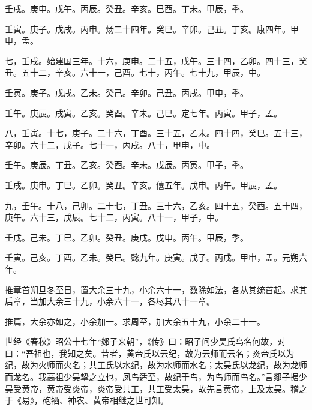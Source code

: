 \documentclass[12pt,UTF8]{ctexbook}
\begin{document}
壬戌。庚申。戊午。丙辰。癸丑。辛亥。巳酉。丁未。甲辰，季。



壬寅。庚子。戊戌。丙申。炀二十四年。癸巳。辛卯。己丑。丁亥。康四年。甲申，孟。



七，壬戌。始建国三年。十六，庚申。二十五，戊午。三十四，乙卯。四十三，癸丑。五十二，辛亥。六十一，己酉。七十，丙午。七十九，甲辰，中。



壬寅。庚子。戊戌。乙未。癸己。辛卯。己丑。丙戌。甲申，季。



壬午。庚辰。戌寅。乙亥。癸酉。辛未。己巳。定七年。丙寅。甲子，孟。



八，壬寅。十七，庚子。二十六，丁酉。三十五，乙未。四十四，癸巳。五十三，辛卯。六十二，戊子。七十一，丙戌。八十，甲申，中。



壬午。庚辰。丁丑。乙亥。癸酉。辛未。戊辰。丙寅。甲子，季。



壬戌。庚申。丁巳。乙卯。癸丑。辛亥。僖五年。戊申。丙午。甲辰，孟。



九，壬午。十八，己卯。二十七，丁丑。三十六，乙亥。四十五，癸酉。五十四，庚午。六十三，戊辰。七十二，丙寅。八十一，甲子，中。



壬戌。己未。丁巳。乙卯。癸丑。庚戌。戊申。丙午。甲辰，季。



壬寅。己亥。丁酉。乙未。癸巳。懿九年。庚寅。戊子。丙戌。甲申，孟。元朔六年。



推章首朔旦冬至日，置大余三十九，小余六十一，数除如法，各从其统首起。求其后章，当加大余三十九，小余六十一，各尽其八十一章。



推篇，大余亦如之，小余加一。求周至，加大余五十九，小余二十一。



世经《春秋》昭公十七年“郯子来朝”，《传》曰：昭子问少昊氏鸟名何故，对曰：“吾祖也，我知之矣。昔者，黄帝氏以云纪，故为云师而云名；炎帝氏以为纪，故为火师而火名；共工氏以水纪，故为水师而水名；太昊氏以龙纪，故为龙师而龙名。我高祖少昊挚之立也，凤鸟适至，故纪于鸟，为鸟师而鸟名。”言郯子据少昊受黄帝，黄帝受炎帝，炎帝受共工，共工受太昊，故先言黄帝，上及太昊。稽之于《易》，砲牺、神农、黄帝相继之世可知。
\end{document}
